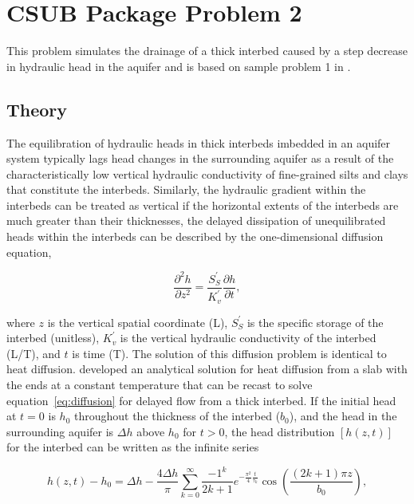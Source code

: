 \section{CSUB Package Problem 2}
This problem simulates the drainage of a thick interbed caused by a step decrease in hydraulic head in the aquifer and is based on sample problem 1 in \cite{hoffmann2003modflow}. 


\subsection{Theory}

The equilibration of hydraulic heads in thick interbeds imbedded in an aquifer system typically lags head changes in the surrounding aquifer as a result of the characteristically low vertical hydraulic conductivity of fine-grained silts and clays that constitute the interbeds. Similarly, the hydraulic gradient within the interbeds can be treated as vertical if the horizontal extents of the interbeds are much greater than their thicknesses, the delayed dissipation of unequilibrated heads within the interbeds can be described by the one-dimensional diffusion equation,

\begin{equation}
	\frac{\partial ^2 h}{\partial z^2} = \frac{S^{\prime}_{S}}{K^{\prime}_{v}} \frac{\partial h}{\partial t},
	\label{eq:diffusion}
\end{equation}

\noindent where $z$ is the vertical spatial coordinate (L), $S^{\prime}_{S}$ is the specific storage of the interbed (unitless), $K^{\prime}_{v}$ is the vertical hydraulic conductivity of the interbed (L/T), and $t$ is time (T). The solution of this diffusion problem is identical to heat diffusion. \cite{carslaw1959conduction} developed an analytical solution for heat diffusion from a slab with the ends at a constant temperature that can be recast to solve equation~\ref{eq:diffusion} for delayed flow from a thick interbed. If the initial head at $t = 0$ is $h_0$ throughout the thickness of the interbed ($b_0$), and the head in the surrounding aquifer is $\Delta h$ above $h_0$ for $t > 0$, the head distribution $[h(z, t)]$ for the interbed can be written as the infinite series

\begin{equation}
	h(z, t) - h_0 = \Delta h - \frac{4 \Delta h}{\pi} \sum^{\infty}_{k = 0} \frac{-1^k}{2k + 1} e^{-\frac{\pi^2}{4} \frac{t}{\tau_k}} \cos \left( \frac{(2k + 1) \pi z}{b_0} \right),
	\label{eq:headdist}
\end{equation}

